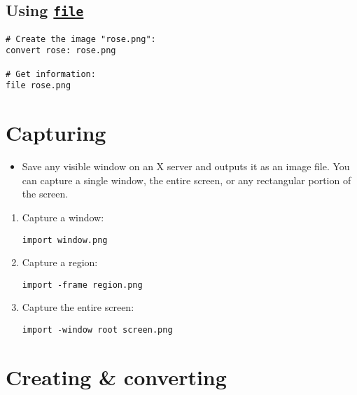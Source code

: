 
\section{Using \href{http://en.wikipedia.org/wiki/File_(command)}{\texttt{file}}}


\begin{lstlisting}
# Create the image "rose.png":
convert rose: rose.png

# Get information:
file rose.png
\end{lstlisting}



\chapter{Capturing}

\begin{itemize}
\item Save any visible window on an X server and outputs it as an
  image file. You can capture a single window, the entire screen, or
  any rectangular portion of the screen.
\end{itemize}

\begin{enumerate}

\item Capture a window:

\begin{lstlisting}
import window.png
\end{lstlisting}

\item Capture a region:

\begin{lstlisting}
import -frame region.png
\end{lstlisting}

\item Capture the entire screen:

\begin{lstlisting}
import -window root screen.png
\end{lstlisting}

\end{enumerate}


\chapter{Creating \& converting}

